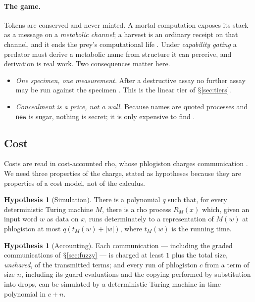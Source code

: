 \documentclass[11pt]{article}
\theoremstyle{definition}
\newtheorem{hypothesis}[definition]{Hypothesis}
\theoremstyle{plain}
\theoremstyle{remark}
\DeclareRobustCommand{\S}{\ifmmode\mathsection\else$\mathsection$\fi}
\begin{document}
\paragraph{The game.} Tokens are conserved and never minted. A mortal
computation exposes its stack as a message on a \emph{metabolic channel};
a harvest is an ordinary receipt on that channel, and it ends the prey's
computational life \cite[\S7]{Scientist}. Under \emph{capability gating}
a predator must derive a metabolic name from structure it can perceive,
and derivation is real work. Two consequences matter here.
\begin{itemize}
\item \emph{One specimen, one measurement.} After a destructive assay no
further assay may be run against the specimen
\cite[Prop.~One specimen]{Scientist}. This is the linear tier of
\S\ref{sec:tiers}.
\item \emph{Concealment is a price, not a wall.} Because names are quoted
processes and \texttt{new} is sugar, nothing is secret; it is only
expensive to find \cite[Rem.~Restriction is sugar]{Scientist}.
\end{itemize}

\subsection{Cost}\label{sec:cost}

Costs are read in cost-accounted rho, whose phlogiston charges
communication \cite{CostMonad}. We need three properties of the charge,
stated as hypotheses because they are properties of a cost model, not of
the calculus.

\begin{hypothesis}[Simulation]\label{hyp:sim}
There is a polynomial $q$ such that, for every deterministic Turing
machine $M$, there is a rho process $R_M(x)$ which, given an input word
$w$ as data on $x$, runs determinately to a representation of $M(w)$ at
phlogiston at most $q(t_M(w) + |w|)$, where $t_M(w)$ is the running time.
\end{hypothesis}

\begin{hypothesis}[Accounting]\label{hyp:acct}
Each communication --- including the graded communications of
\S\ref{sec:fuzzy} --- is charged at least $1$ plus the total size,
\emph{unshared}, of the transmitted terms; and every run of phlogiston $c$
from a term of size $n$, including its guard evaluations and the copying
performed by substitution into drops, can be simulated by a deterministic
Turing machine in time polynomial in $c + n$.
\end{hypothesis}
\end{document}
